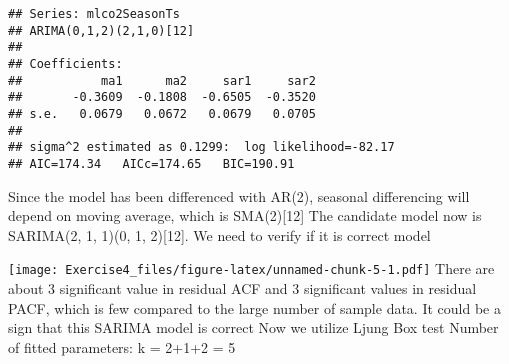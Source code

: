 \documentclass[
]{article}
\newenvironment{Shaded}{\begin{snugshade}}{\end{snugshade}}
\newcommand{\AttributeTok}[1]{\textcolor[rgb]{0.77,0.63,0.00}{#1}}
\newcommand{\DecValTok}[1]{\textcolor[rgb]{0.00,0.00,0.81}{#1}}
\newcommand{\FloatTok}[1]{\textcolor[rgb]{0.00,0.00,0.81}{#1}}
\newcommand{\FunctionTok}[1]{\textcolor[rgb]{0.00,0.00,0.00}{#1}}
\newcommand{\NormalTok}[1]{#1}
\newcommand{\OtherTok}[1]{\textcolor[rgb]{0.56,0.35,0.01}{#1}}
\newcommand{\SpecialCharTok}[1]{\textcolor[rgb]{0.00,0.00,0.00}{#1}}
\newcommand{\StringTok}[1]{\textcolor[rgb]{0.31,0.60,0.02}{#1}}
\begin{document}
\begin{verbatim}
## Series: mlco2SeasonTs 
## ARIMA(0,1,2)(2,1,0)[12] 
## 
## Coefficients:
##           ma1      ma2     sar1     sar2
##       -0.3609  -0.1808  -0.6505  -0.3520
## s.e.   0.0679   0.0672   0.0679   0.0705
## 
## sigma^2 estimated as 0.1299:  log likelihood=-82.17
## AIC=174.34   AICc=174.65   BIC=190.91
\end{verbatim}

Since the model has been differenced with AR(2), seasonal differencing
will depend on moving average, which is SMA(2){[}12{]} The candidate
model now is SARIMA(2, 1, 1)(0, 1, 2){[}12{]}. We need to verify if it
is correct model

\begin{Shaded}
\end{Shaded}

\texttt{[image: Exercise4\_files/figure-latex/unnamed-chunk-5-1.pdf]}
There are about 3 significant value in residual ACF and 3 significant
values in residual PACF, which is few compared to the large number of
sample data. It could be a sign that this SARIMA model is correct Now we
utilize Ljung Box test Number of fitted parameters: k = 2+1+2 = 5
\end{document}
